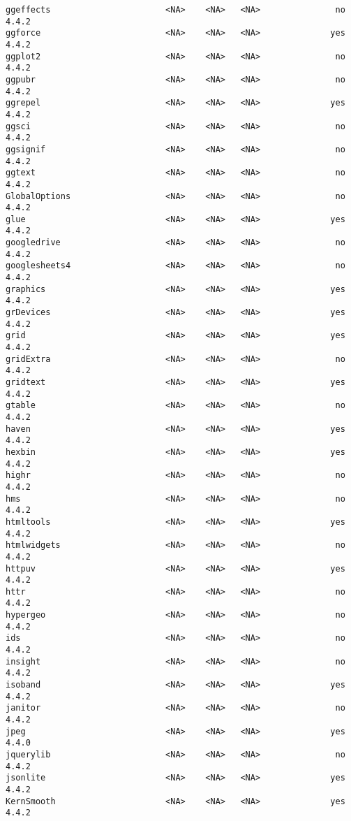 \documentclass[
  letterpaper,
  DIV=11,
  numbers=noendperiod]{scrreprt}
\begin{document}
\begin{verbatim}
ggeffects                       <NA>    <NA>   <NA>               no 4.4.2
ggforce                         <NA>    <NA>   <NA>              yes 4.4.2
ggplot2                         <NA>    <NA>   <NA>               no 4.4.2
ggpubr                          <NA>    <NA>   <NA>               no 4.4.2
ggrepel                         <NA>    <NA>   <NA>              yes 4.4.2
ggsci                           <NA>    <NA>   <NA>               no 4.4.2
ggsignif                        <NA>    <NA>   <NA>               no 4.4.2
ggtext                          <NA>    <NA>   <NA>               no 4.4.2
GlobalOptions                   <NA>    <NA>   <NA>               no 4.4.2
glue                            <NA>    <NA>   <NA>              yes 4.4.2
googledrive                     <NA>    <NA>   <NA>               no 4.4.2
googlesheets4                   <NA>    <NA>   <NA>               no 4.4.2
graphics                        <NA>    <NA>   <NA>              yes 4.4.2
grDevices                       <NA>    <NA>   <NA>              yes 4.4.2
grid                            <NA>    <NA>   <NA>              yes 4.4.2
gridExtra                       <NA>    <NA>   <NA>               no 4.4.2
gridtext                        <NA>    <NA>   <NA>              yes 4.4.2
gtable                          <NA>    <NA>   <NA>               no 4.4.2
haven                           <NA>    <NA>   <NA>              yes 4.4.2
hexbin                          <NA>    <NA>   <NA>              yes 4.4.2
highr                           <NA>    <NA>   <NA>               no 4.4.2
hms                             <NA>    <NA>   <NA>               no 4.4.2
htmltools                       <NA>    <NA>   <NA>              yes 4.4.2
htmlwidgets                     <NA>    <NA>   <NA>               no 4.4.2
httpuv                          <NA>    <NA>   <NA>              yes 4.4.2
httr                            <NA>    <NA>   <NA>               no 4.4.2
hypergeo                        <NA>    <NA>   <NA>               no 4.4.2
ids                             <NA>    <NA>   <NA>               no 4.4.2
insight                         <NA>    <NA>   <NA>               no 4.4.2
isoband                         <NA>    <NA>   <NA>              yes 4.4.2
janitor                         <NA>    <NA>   <NA>               no 4.4.2
jpeg                            <NA>    <NA>   <NA>              yes 4.4.0
jquerylib                       <NA>    <NA>   <NA>               no 4.4.2
jsonlite                        <NA>    <NA>   <NA>              yes 4.4.2
KernSmooth                      <NA>    <NA>   <NA>              yes 4.4.2

\end{verbatim}
\end{document}
